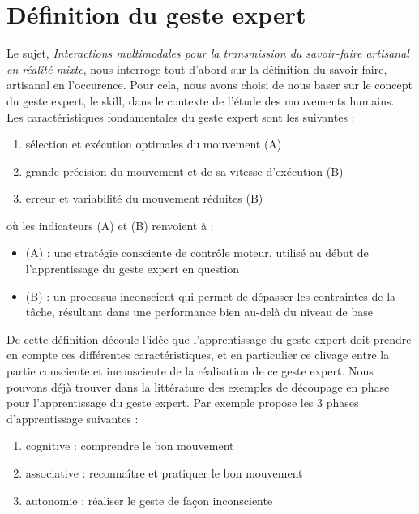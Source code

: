 \section{Définition du geste expert} \label{definition_geste_expert}

Le sujet, \textit{Interactions multimodales pour la transmission du savoir-faire artisanal en réalité mixte}, nous interroge tout d'abord sur la définition du savoir-faire, artisanal en l'occurence.
Pour cela, nous avons choisi de nous baser sur le concept du geste expert, le skill, dans le contexte de l'étude des mouvements humains. \\

Les caractéristiques fondamentales du geste expert sont les suivantes \cite{Reflecting_skill.Yadav+} : 
\begin{enumerate}
    \item sélection et exécution optimales du mouvement (A)
    \item grande précision du mouvement et de sa vitesse d'exécution (B)
    \item erreur et variabilité du mouvement réduites (B)
\end{enumerate}

où les indicateurs (A) et (B) renvoient à :
\begin{itemize}
\item (A) : une stratégie consciente de contrôle moteur, utilisé au début de l'apprentissage du geste expert en question
\item (B) : un processus inconscient qui permet de dépasser les contraintes de la tâche, résultant dans une performance bien au-delà du niveau de base
\end{itemize}

De cette définition découle l'idée que l'apprentissage du geste expert doit prendre en compte ces différentes caractéristiques, et en particulier ce clivage entre la partie consciente et inconsciente de la réalisation de ce geste expert. 
Nous pouvons déjà trouver dans la littérature des exemples de découpage en phase pour l'apprentissage du geste expert. 
Par exemple \cite{Coembodiment.Kodama+} propose les 3 phases d'apprentissage suivantes : 
\begin{enumerate}
    \item cognitive : comprendre le bon mouvement
    \item associative : reconnaître et pratiquer le bon mouvement
    \item autonomie : réaliser le geste de façon inconsciente
\end{enumerate}

